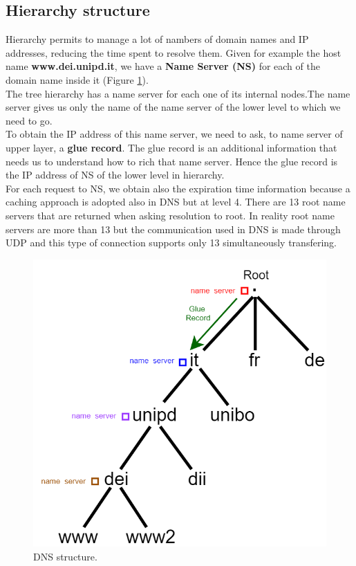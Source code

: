 \subsection{Hierarchy structure}
Hierarchy permits to manage a lot of nambers of domain names and IP addresses, reducing the time spent to resolve them. Given for example the host name \textbf{www.dei.unipd.it}, we have a \textbf{Name Server (NS)} for each of the domain name inside it (Figure \ref{DNS_hierarchy}).\\
The tree hierarchy has a name server for each one of its internal nodes.The name server gives us only the name of the name server of the lower level to which we need to go.\\
To obtain the IP address of this name server, we need to ask, to name server of upper layer, a \textbf{glue record}. The glue record is an additional information that needs us to understand how to rich that name server. Hence the glue record is the IP address of NS of the lower level in hierarchy. \\
For each request to NS, we obtain also the expiration time information because a caching approach is adopted also in DNS but at level 4. There are 13 root name servers that are returned when asking resolution to root. In reality root name servers are more than 13 but the communication used in DNS is made through UDP and this type of connection supports only 13 simultaneously transfering.
\begin{figure}[h]
\centering
\includegraphics[scale=0.4]{Images/Resolution/DNS_hierarchy}
\caption{\footnotesize{DNS structure.}}\label{DNS_hierarchy}
\end{figure}
